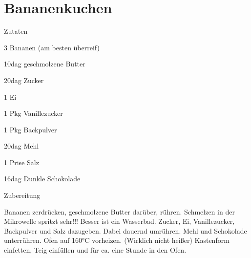 \chapter*{Bananenkuchen}
\begin{multicols}{2}
 {\Large Zutaten}
 \begin{Zutaten}
		\item 3 Bananen (am besten überreif)
		\item 10dag geschmolzene Butter
		\item 20dag Zucker
		\item 1 Ei
		\item 1 Pkg Vanillezucker
		\item 1 Pkg Backpulver
		\item 20dag Mehl
		\item 1 Prise Salz
		\item 16dag Dunkle Schokolade
		
\end{Zutaten}
	
\columnbreak
{}
\end{multicols}

{\Large Zubereitung} \newline
\begin{addmargin}[1cm]{0cm}
	Bananen zerdrücken, geschmolzene Butter darüber, rühren. Schmelzen in der Mikrowelle spritzt sehr!!! Besser ist ein Wasserbad. \newline
	Zucker, Ei, Vanillezucker, Backpulver und Salz dazugeben. Dabei dauernd umrühren. \newline
	Mehl und Schokolade unterrühren. \newline
	Ofen auf 160°C vorheizen. (Wirklich nicht heißer) \newline
	Kastenform einfetten, Teig einfüllen und für ca. eine Stunde in den Ofen.
	
	
\end{addmargin}
